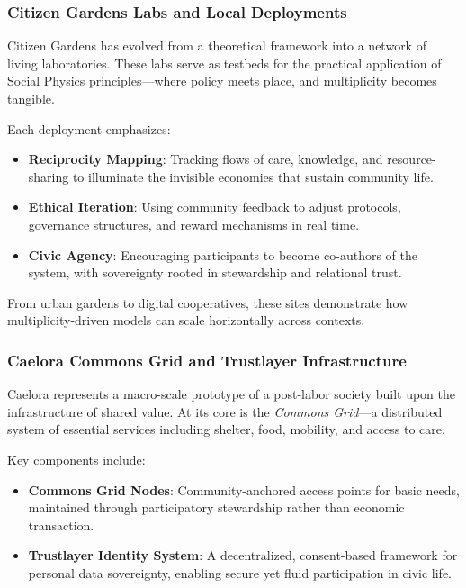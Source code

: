 \documentclass{article}
\theoremstyle{plain}
\theoremstyle{claimstyle}
\begin{document}
\subsubsection{Citizen Gardens Labs and Local Deployments}

Citizen Gardens has evolved from a theoretical framework into a network of living laboratories. These labs serve as testbeds for the practical application of Social Physics principles—where policy meets place, and multiplicity becomes tangible.

Each deployment emphasizes:

\begin{itemize}
    \item \textbf{Reciprocity Mapping}: Tracking flows of care, knowledge, and resource-sharing to illuminate the invisible economies that sustain community life.
    \item \textbf{Ethical Iteration}: Using community feedback to adjust protocols, governance structures, and reward mechanisms in real time.
    \item \textbf{Civic Agency}: Encouraging participants to become co-authors of the system, with sovereignty rooted in stewardship and relational trust.
\end{itemize}

From urban gardens to digital cooperatives, these sites demonstrate how multiplicity-driven models can scale horizontally across contexts.

\subsubsection{Caelora Commons Grid and Trustlayer Infrastructure}

Caelora represents a macro-scale prototype of a post-labor society built upon the infrastructure of shared value. At its core is the \textit{Commons Grid}—a distributed system of essential services including shelter, food, mobility, and access to care.

Key components include:

\begin{itemize}
    \item \textbf{Commons Grid Nodes}: Community-anchored access points for basic needs, maintained through participatory stewardship rather than economic transaction.
    \item \textbf{Trustlayer Identity System}: A decentralized, consent-based framework for personal data sovereignty, enabling secure yet fluid participation in civic life.
\end{itemize}
\end{document}
